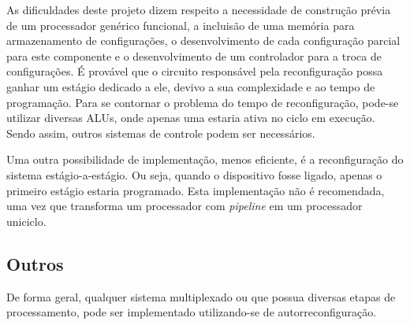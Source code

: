 As dificuldades deste projeto dizem respeito a necessidade de construção prévia de um processador genérico funcional, a incluisão de uma memória para armazenamento de configurações, o desenvolvimento de cada configuração parcial para este componente e o desenvolvimento de um controlador para a troca de configurações.
É provável que o circuito responsável pela reconfiguração possa ganhar um estágio dedicado a ele, devivo a sua complexidade e ao tempo de programação.
Para se contornar o problema do tempo de reconfiguração, pode-se utilizar diversas ALUs, onde apenas uma estaria ativa no ciclo em execução.
Sendo assim, outros sistemas de controle podem ser necessários.

Uma outra possibilidade de implementação, menos eficiente, é a reconfiguração do sistema estágio-a-estágio.
Ou seja, quando o dispositivo fosse ligado, apenas o primeiro estágio estaria programado.
Esta implementação não é recomendada, uma vez que transforma um processador com \textit{pipeline} em um processador uniciclo.

\subsection{Outros}
De forma geral, qualquer sistema multiplexado ou que possua diversas etapas de processamento, pode ser implementado utilizando-se de autorreconfiguração.

